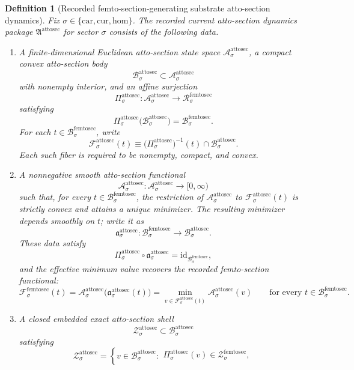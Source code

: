 \documentclass[11pt]{article}
\newcommand{\Car}{\mathrm{car}}
\newcommand{\Cur}{\mathrm{cur}}
\newcommand{\Hom}{\mathrm{hom}}
\newcommand{\FemtoSectionSpace}[1]{\mathcal R_{#1}^{\mathrm{femtosec}}}
\newcommand{\FemtoSectionBody}[1]{\mathcal B_{#1}^{\mathrm{femtosec}}}
\newcommand{\FemtoSectionFunctional}[1]{\mathscr F_{#1}^{\mathrm{femtosec}}}
\newcommand{\FemtoSectionShell}[1]{\mathcal Z_{#1}^{\mathrm{femtosec}}}
\newcommand{\AttoSectionPackage}{\mathfrak A^{\mathrm{attosec}}}
\newcommand{\AttoSectionSpace}[1]{\mathcal A_{#1}^{\mathrm{attosec}}}
\newcommand{\AttoSectionBody}[1]{\mathcal B_{#1}^{\mathrm{attosec}}}
\newcommand{\AttoSectionProj}[1]{\Pi_{#1}^{\mathrm{attosec}}}
\newcommand{\AttoSectionFiber}[2]{\mathcal F_{#1}^{\mathrm{attosec}}(#2)}
\newcommand{\AttoSectionFemtoMin}[1]{\mathfrak a_{#1}^{\mathrm{attosec}}}
\newcommand{\AttoSectionFunctional}[1]{\mathscr A_{#1}^{\mathrm{attosec}}}
\newcommand{\AttoSectionShell}[1]{\mathcal Z_{#1}^{\mathrm{attosec}}}
\newtheorem{definition}{Definition}
\begin{document}
\begin{definition}[Recorded femto-section-generating substrate atto-section dynamics]
\label{def:attosec}
Fix \(\sigma\in\{\Car,\Cur,\Hom\}\). The recorded current atto-section dynamics package \(\AttoSectionPackage\) for sector \(\sigma\) consists of the following data.
\begin{enumerate}
    \item A finite-dimensional Euclidean atto-section state space \(\AttoSectionSpace{\sigma}\), a compact convex atto-section body
    \[
    \AttoSectionBody{\sigma}\subset\AttoSectionSpace{\sigma}
    \]
    with nonempty interior, and an affine surjection
    \[
    \AttoSectionProj{\sigma}:\AttoSectionSpace{\sigma}\to\FemtoSectionSpace{\sigma}
    \]
    satisfying
    \[
    \AttoSectionProj{\sigma}\bigl(\AttoSectionBody{\sigma}\bigr)=\FemtoSectionBody{\sigma}.
    \]
    For each \(t\in\FemtoSectionBody{\sigma}\), write
    \[
    \AttoSectionFiber{\sigma}{t}
    \equiv
    \bigl(\AttoSectionProj{\sigma}\bigr)^{-1}(t)\cap\AttoSectionBody{\sigma}.
    \]
    Each such fiber is required to be nonempty, compact, and convex.
    \item A nonnegative smooth atto-section functional
    \[
    \AttoSectionFunctional{\sigma}:\AttoSectionSpace{\sigma}\to[0,\infty)
    \]
    such that, for every \(t\in\FemtoSectionBody{\sigma}\), the restriction of \(\AttoSectionFunctional{\sigma}\) to \(\AttoSectionFiber{\sigma}{t}\) is strictly convex and attains a unique minimizer. The resulting minimizer depends smoothly on \(t\); write it as
    \[
    \AttoSectionFemtoMin{\sigma}:\FemtoSectionBody{\sigma}\to\AttoSectionBody{\sigma}.
    \]
    These data satisfy
    \[
    \AttoSectionProj{\sigma}\circ\AttoSectionFemtoMin{\sigma}
    =
    \mathrm{id}_{\FemtoSectionBody{\sigma}},
    \]
    and the effective minimum value recovers the recorded femto-section functional:
    \[
    \FemtoSectionFunctional{\sigma}(t)
    =
    \AttoSectionFunctional{\sigma}\bigl(\AttoSectionFemtoMin{\sigma}(t)\bigr)
    =
    \min_{v\in\AttoSectionFiber{\sigma}{t}}
    \AttoSectionFunctional{\sigma}(v)
    \qquad
    \text{for every }
    t\in\FemtoSectionBody{\sigma}.
    \]
    \item A closed embedded exact atto-section shell
    \[
    \AttoSectionShell{\sigma}\subset\AttoSectionBody{\sigma}
    \]
    satisfying
    \[
    \AttoSectionShell{\sigma}
    =
    \left\{
    v\in\AttoSectionBody{\sigma}:
    \begin{array}{l}
    \AttoSectionProj{\sigma}(v)\in\FemtoSectionShell{\sigma},\\[0.2em]

\end{array}\]
\end{enumerate}
\end{definition}
\end{document}
